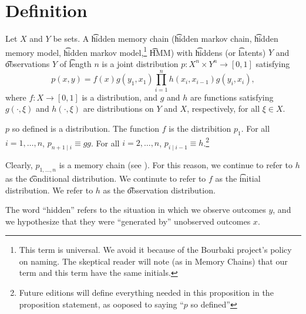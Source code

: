 
\section*{Definition}

Let $X$ and $Y$ be sets.
A \t{hidden memory chain} (\t{hidden markov chain}, \t{hidden memory model}, \t{hidden markov model},\footnote{This term is universal.
We avoid it because of the Bourbaki project's policy on naming.
The skeptical reader will note (as in  {Memory Chains}) that our term and this term have the same initials.}
\t{HMM}) with \t{hiddens} (or \t{latents}) $Y$ and \t{observations} $Y$ of \t{length} $n$ is a joint distribution $p: X^n \times Y^n \to [0, 1]$ satisfying
\[
p(x, y) = f(x)g(y_1, x_1)\prod_{i = 1}^{n} h(x_i, x_{i-1}) g(y_i, x_i),
\]
where $f: X \to [0, 1]$ is a distribution, and $g$ and $h$ are functions satisfying $g(\cdot , \xi )$ and $h(\cdot , \xi )$ are distributions on $Y$ and $X$, respectively, for all $\xi \in X$.
\begin{proposition}
$p$ so defined is a distribution.
The function $f$ is the distribition $p_{1}$.
For all $i = 1, \dots , n$, $p_{n+1 \mid i} \equiv gg$.
For all $i = 2, \dots , n$, $p_{i \mid i-1} \equiv h$.\footnote{Future editions will define everything needed in this proposition in the proposition statement, as ooposed to saying ``$p$ so defined''}
\end{proposition}


Clearly, $p_{1, \dots , n}$ is a memory chain (see ).
For this reason, we continue to refer to $h$ as the \t{conditional distribution}.
We continute to refer to $f$ as the \t{initial distribution}.
We refer to $h$ as the \t{observation distribution}.

The word ``hidden'' refers to the situation in which we observe outcomes $y$, and we hypothesize that they were ``generated by'' unobserved outcomes $x$.

\blankpage